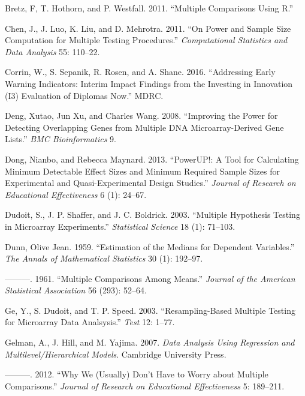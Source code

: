 \documentclass[
]{article}
\newlength{\cslhangindent}
\newlength{\cslentryspacingunit} %
\newenvironment{CSLReferences}[2] %
 {%
  \setlength{\parindent}{0pt}
  \ifodd #1
  \let\oldpar\par
  \def\par{\hangindent=\cslhangindent\oldpar}
  \fi
  \setlength{\parskip}{#2\cslentryspacingunit}
 }%
 {}
\begin{document}
\begin{CSLReferences}{1}{0}
\leavevmode{}%
Bretz, F, T. Hothorn, and P. Westfall. 2011. {``Multiple Comparisons
Using {R}.''}

\leavevmode{}%
Chen, J., J. Luo, K. Liu, and D. Mehrotra. 2011. {``On Power and Sample
Size Computation for Multiple Testing Procedures.''} \emph{Computational
Statistics and Data Analysis} 55: 110--22.

\leavevmode{}%
Corrin, W., S. Sepanik, R. Rosen, and A. Shane. 2016. {``Addressing
Early Warning Indicators: Interim Impact Findings from the Investing in
Innovation (I3) Evaluation of Diplomas Now.''} MDRC.

\leavevmode{}%
Deng, Xutao, Jun Xu, and Charles Wang. 2008. {``Improving the Power for
Detecting Overlapping Genes from Multiple DNA Microarray-Derived Gene
Lists.''} \emph{BMC Bioinformatics} 9.

\leavevmode{}%
Dong, Nianbo, and Rebecca Maynard. 2013. {``PowerUP!: A Tool for
Calculating Minimum Detectable Effect Sizes and Minimum Required Sample
Sizes for Experimental and Quasi-Experimental Design Studies.''}
\emph{Journal of Research on Educational Effectiveness} 6 (1): 24--67.

\leavevmode{}%
Dudoit, S., J. P. Shaffer, and J. C. Boldrick. 2003. {``Multiple
Hypothesis Testing in Microarray Experiments.''} \emph{Statistical
Science} 18 (1): 71--103.

\leavevmode{}%
Dunn, Olive Jean. 1959. {``Estimation of the Medians for Dependent
Variables.''} \emph{The Annals of Mathematical Statistics} 30 (1):
192--97.

\leavevmode{}%
---------. 1961. {``Multiple Comparisons Among Means.''} \emph{Journal
of the American Statistical Association} 56 (293): 52--64.

\leavevmode{}%
Ge, Y., S. Dudoit, and T. P. Speed. 2003. {``Resampling-Based Multiple
Testing for Microarray Data Analsysis.''} \emph{Test} 12: 1--77.

\leavevmode{}%
Gelman, A., J. Hill, and M. Yajima. 2007. \emph{Data Analysis Using
Regression and Multilevel/Hierarchical Models}. Cambridge University
Press.

\leavevmode{}%
---------. 2012. {``Why We (Usually) Don't Have to Worry about Multiple
Comparisons.''} \emph{Journal of Research on Educational Effectiveness}
5: 189--211.


\end{CSLReferences}
\end{document}
